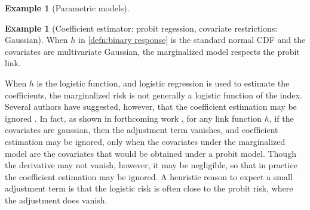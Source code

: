 \documentclass[12pt]{article}
\theoremstyle{definition}
\newtheorem{example}{Example}%
\newtheorem{subexample}{Example}%
\newcommand{\comment}[1]{
  \iftoggle{commenttoggle}{
    {\normalsize{\color{red}{ #1}}\normalsize}
  }
  {}
}
\begin{document}
\begin{example}[Parametric models]



\begin{subexample}[Coefficient estimator: probit regession, covariate
  restrictions: Gaussian] When $h$ in \eqref{defn:binary response} is
  the standard normal CDF and the covariates are multivariate
  Gaussian, the marginalized model respects the probit link.%
\end{subexample}


When $h$ is the logistic function, and logistic regression is used to
estimate the coefficients, the marginalized risk is not generally a
logistic function of the index. Several authors have suggested,
however, that the coefficient estimation may be ignored
\citep{demler2011} \comment{give citations. is this the right demler
  paper?}. In fact, as shown in forthcoming work \comment{or add to
  appendix?}, for any link function $h$, if the covariates are gaussian,
then the adjustment term vanishes, and coefficient estimation may be
ignored, only when the covariates under the marginalized model are the
covariates that would be obtained under a probit model. Though the
derivative may not vanish, however, it may be negligible, so that in
practice the coefficient estimation may be ignored. A heuristic reason
to expect a small adjustment term is that the logistic risk
is often close to the probit risk, where the adjustment does
vanish.


\end{example}
\end{document}
